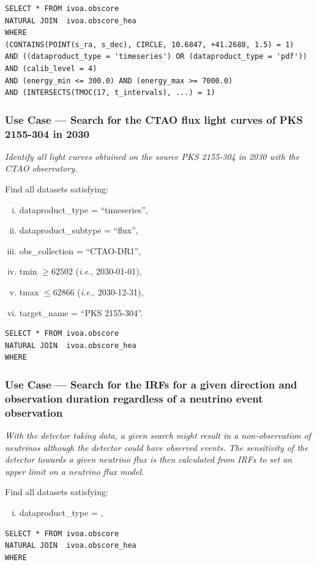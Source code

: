 \begin{verbatim}
SELECT * FROM ivoa.obscore
NATURAL JOIN  ivoa.obscore_hea
WHERE
(CONTAINS(POINT(s_ra, s_dec), CIRCLE, 10.6847, +41.2688, 1.5) = 1)
AND ((dataproduct_type = 'timeseries') OR (dataproduct_type = 'pdf'))
AND (calib_level = 4)
AND (energy_min <= 300.0) AND (energy_max >= 7000.0)
AND (INTERSECTS(TMOC(17, t_intervals), ...) = 1)
\end{verbatim}

\subsubsection{Use Case --- Search for the CTAO flux light curves of PKS 2155-304 in 2030}

{\em Identify all light curves obtained on the source PKS 2155-304 in 2030 with the CTAO observatory.\/}

\medskip
\noindent Find all datasets satisfying:
\begin{enumerate}[(i)]
  \item dataproduct\_type = ``timeseries'',
  \item dataproduct\_subtype = ``flux'',
  \item obs\_collection = ``CTAO-DR1'',
  \item tmin $\geq 62502$ ({\em i.e.\/}, 2030-01-01),
  \item tmax $\leq 62866$ ({\em i.e.\/}, 2030-12-31),
  \item target\_name = ``PKS 2155-304''.
\end{enumerate}

\begin{verbatim}
SELECT * FROM ivoa.obscore
NATURAL JOIN  ivoa.obscore_hea
WHERE
\end{verbatim}

\subsubsection{Use Case --- Search for the \glspl{IRF} for a given direction and observation duration regardless of a neutrino event observation}

{\em With the detector taking data, a given search might result in a non-observation of neutrinos although the detector could have observed events. The sensitivity of the detector towards a given neutrino flux is then calculated from IRFs to set an upper limit on a neutrino flux model.\/}

\medskip
\noindent Find all datasets satisfying:
\begin{enumerate}[(i)]
  \item dataproduct\_type = ,
\end{enumerate}

\begin{verbatim}
SELECT * FROM ivoa.obscore
NATURAL JOIN  ivoa.obscore_hea
WHERE
\end{verbatim}
